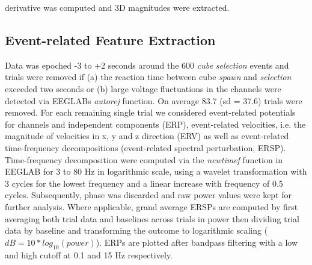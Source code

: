 derivative was computed and 3D magnitudes were extracted.

\subsection{Event-related Feature Extraction}
Data was epoched -3 to +2 seconds around the 600 \textit{cube selection} events and trials were removed if (a) the reaction time between cube \textit{spawn} and \textit{selection} exceeded two seconds or (b) large voltage fluctuations in the channels were detected via EEGLABs \textit{autorej} function. On average 83.7 (sd = 37.6) trials were removed. For each remaining single trial we considered event-related potentials for channels and independent components (ERP), event-related velocities, i.e. the magnitude of velocities in x, y and z direction (ERV) as well as event-related time-frequency decompositions (event-related spectral perturbation, ERSP). Time-frequency decomposition were computed via the \textit{newtimef} function in EEGLAB for 3 to 80 Hz in logarithmic scale, using a wavelet transformation with 3 cycles for the lowest frequency and a linear increase with frequency of 0.5 cycles. Subsequently, phase was discarded and raw power values were kept for further analysis. Where applicable, grand average ERSPs are computed by first averaging both trial data and baselines across trials in power then dividing trial data by baseline and transforming the outcome to logarithmic scaling ($dB = 10*log_{10}(power)$). ERPs are plotted after bandpass filtering with a low and high cutoff at 0.1 and 15 Hz respectively.

